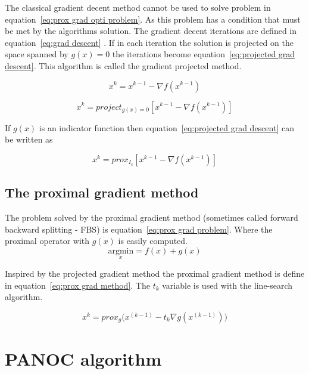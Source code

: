 \documentclass[]{article}
\begin{document}
		The classical gradient decent method cannot be used to solve problem in equation~\ref{eq:prox grad opti problem}. As this problem has a condition that must be met by the algorithms solution. The gradient decent iterations are defined in equation~\ref{eq:grad descent} . If in each iteration the solution is projected on the space spanned by $g(x)=0$ the iterations become equation~\ref{eq:projected grad descent}. This algorithm is called the gradient projected method.
		
		\begin{equation}
			x^k = x^{k-1} - \nabla f(x^{k-1})
			\label{eq:grad descent}
		\end{equation}
		
		\begin{equation}
			x^k = project_{g(x)=0}[ x^{k-1} - \nabla f(x^{k-1})]
			\label{eq:projected grad descent}
		\end{equation}
		
		If $g(x)$ is an indicator function then  equation~\ref{eq:projected grad descent} can be written as 
		
		\begin{equation}
				x^k = prox_{I_c}[ x^{k-1} - \nabla f(x^{k-1})]
			\label{eq:proximal grad descent}
		\end{equation}
	
	\subsection{The proximal gradient method}
		The problem solved by the proximal gradient method (sometimes called forward backward splitting - FBS) is equation~\ref{eq:prox grad problem}. Where the proximal operator with $g(x)$ is easily computed. 
			\begin{equation}
			\underset{x}{\text{argmin}} = f(x) + g(x)
			\label{eq:prox grad problem}
			\end{equation}
		
		Inspired by the projected gradient method the proximal gradient method is define in equation~\ref{eq:prox grad method}. The $t_k$ variable is used with the line-search algorithm.
		
		\begin{equation}
			x^k = prox_{g}\big( x^{(k-1)}- t_k \nabla g(x^{(k-1)})\big)
			\label{eq:prox grad method}
		\end{equation}


\section{PANOC algorithm}
\end{document}
